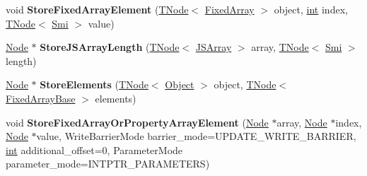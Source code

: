 \begin{DoxyCompactItemize}
\item 
\mbox{\label{classv8_1_1internal_1_1CodeStubAssembler_aa87ffa4ac78637674c18fa16a2920a1f}} 
void {\bfseries Store\+Fixed\+Array\+Element} (\mbox{\hyperlink{classv8_1_1internal_1_1compiler_1_1TNode}{T\+Node}}$<$ \mbox{\hyperlink{classv8_1_1internal_1_1FixedArray}{Fixed\+Array}} $>$ object, \mbox{\hyperlink{classint}{int}} index, \mbox{\hyperlink{classv8_1_1internal_1_1compiler_1_1TNode}{T\+Node}}$<$ \mbox{\hyperlink{classv8_1_1internal_1_1Smi}{Smi}} $>$ value)
\item 
\mbox{\label{classv8_1_1internal_1_1CodeStubAssembler_a8021ee9f8cab6ebcfb9abd0d47f16ce5}} 
\mbox{\hyperlink{classv8_1_1internal_1_1compiler_1_1Node}{Node}} $\ast$ {\bfseries Store\+J\+S\+Array\+Length} (\mbox{\hyperlink{classv8_1_1internal_1_1compiler_1_1TNode}{T\+Node}}$<$ \mbox{\hyperlink{classv8_1_1internal_1_1JSArray}{J\+S\+Array}} $>$ array, \mbox{\hyperlink{classv8_1_1internal_1_1compiler_1_1TNode}{T\+Node}}$<$ \mbox{\hyperlink{classv8_1_1internal_1_1Smi}{Smi}} $>$ length)
\item 
\mbox{\label{classv8_1_1internal_1_1CodeStubAssembler_a550550dca2a190d49582c61c30e42832}} 
\mbox{\hyperlink{classv8_1_1internal_1_1compiler_1_1Node}{Node}} $\ast$ {\bfseries Store\+Elements} (\mbox{\hyperlink{classv8_1_1internal_1_1compiler_1_1TNode}{T\+Node}}$<$ \mbox{\hyperlink{classv8_1_1internal_1_1Object}{Object}} $>$ object, \mbox{\hyperlink{classv8_1_1internal_1_1compiler_1_1TNode}{T\+Node}}$<$ \mbox{\hyperlink{classv8_1_1internal_1_1FixedArrayBase}{Fixed\+Array\+Base}} $>$ elements)
\item 
\mbox{\label{classv8_1_1internal_1_1CodeStubAssembler_a4a81c1fa6f05c39c0d9fcef6c0760b23}} 
void {\bfseries Store\+Fixed\+Array\+Or\+Property\+Array\+Element} (\mbox{\hyperlink{classv8_1_1internal_1_1compiler_1_1Node}{Node}} $\ast$array, \mbox{\hyperlink{classv8_1_1internal_1_1compiler_1_1Node}{Node}} $\ast$index, \mbox{\hyperlink{classv8_1_1internal_1_1compiler_1_1Node}{Node}} $\ast$value, Write\+Barrier\+Mode barrier\+\_\+mode=U\+P\+D\+A\+T\+E\+\_\+\+W\+R\+I\+T\+E\+\_\+\+B\+A\+R\+R\+I\+ER, \mbox{\hyperlink{classint}{int}} additional\+\_\+offset=0, Parameter\+Mode parameter\+\_\+mode=I\+N\+T\+P\+T\+R\+\_\+\+P\+A\+R\+A\+M\+E\+T\+E\+RS)

\end{DoxyCompactItemize}
